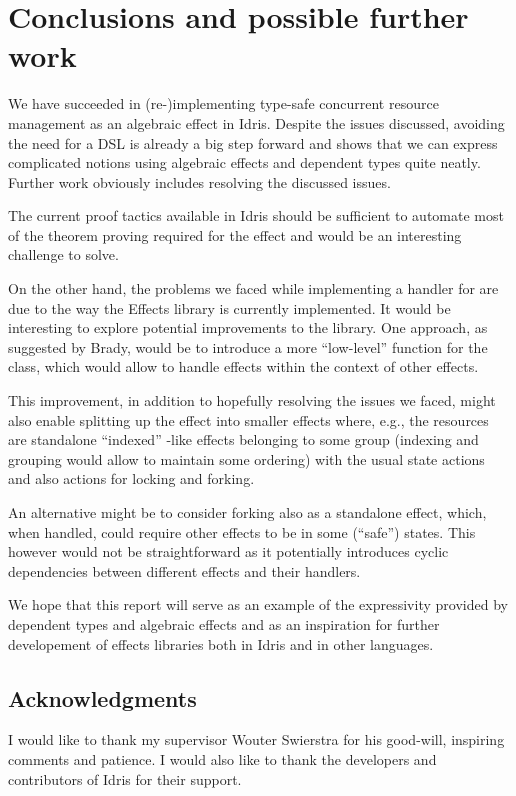 \section{Conclusions and possible further work}

We have succeeded in (re-)implementing type-safe concurrent resource
management as an algebraic effect in Idris. Despite the issues discussed,
avoiding the need for a DSL is already a big step forward and shows that we can
express complicated notions using algebraic effects and dependent types quite
neatly. Further work obviously includes resolving the discussed issues.

The current proof tactics available in Idris should be sufficient to automate
most of the theorem proving required for the  effect and would
be an interesting challenge to solve.

On the other hand, the problems we faced while implementing a handler for
 are due to the way the Effects library is currently implemented. It
would be interesting to explore potential improvements to the library. One
approach, as suggested by Brady, would be to introduce a more ``low-level''
 function for the  class, which would allow to
handle effects within the context of other effects.

This improvement, in addition to hopefully resolving the issues we faced, might
also enable splitting up the  effect into smaller effects
where, e.g., the resources are standalone ``indexed'' -like effects
belonging to some group (indexing and grouping would allow to maintain some
ordering) with the usual state actions and also actions for locking and forking.

An alternative might be to consider forking also as a standalone effect, which,
when handled, could require other effects to be in some (``safe'') states.
This however would not be straightforward as it potentially introduces
cyclic dependencies between different effects and their handlers.

We hope that this report will serve as an example of the expressivity provided
by dependent types and algebraic effects and as an inspiration for further
developement of effects libraries both in Idris and in other languages.

\subsection*{Acknowledgments}

I would like to thank my supervisor Wouter Swierstra for his good-will,
inspiring comments and patience. I would also like to thank the developers and
contributors of Idris for their support.
